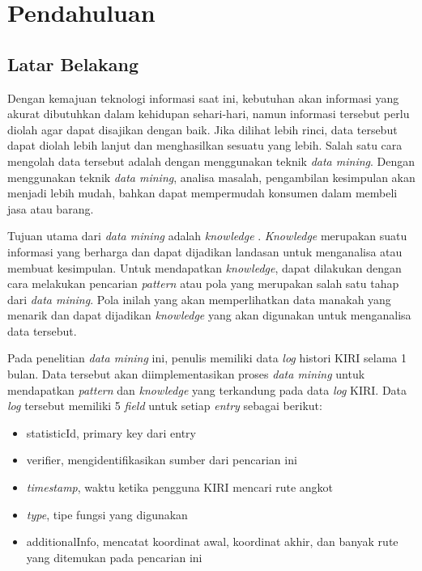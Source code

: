 \chapter{Pendahuluan}
\label{chap:intro}

\section{Latar Belakang}
\label{sec:motivation}

Dengan kemajuan teknologi informasi saat ini, kebutuhan akan informasi yang akurat dibutuhkan dalam kehidupan sehari-hari, namun informasi tersebut perlu diolah agar dapat disajikan dengan baik. Jika dilihat lebih rinci, data tersebut dapat diolah lebih lanjut dan menghasilkan sesuatu yang lebih. Salah satu cara mengolah data tersebut adalah dengan menggunakan teknik \textsl{data mining}. Dengan menggunakan teknik \textsl{data mining}, analisa masalah, pengambilan kesimpulan akan menjadi lebih mudah, bahkan dapat mempermudah konsumen dalam membeli jasa atau barang.

Tujuan utama dari \textsl{data mining} adalah \textsl{knowledge} \cite{DM}. \textsl{Knowledge} merupakan suatu informasi yang berharga dan dapat dijadikan landasan untuk menganalisa atau membuat kesimpulan. Untuk mendapatkan \textsl{knowledge}, dapat dilakukan dengan cara melakukan pencarian \textsl{pattern} atau pola yang merupakan salah satu tahap dari \textsl{data mining}. Pola inilah yang akan memperlihatkan data manakah yang menarik dan dapat dijadikan \textsl{knowledge} yang akan digunakan untuk menganalisa data tersebut.

Pada penelitian \textsl{data mining} ini, penulis memiliki data \textsl{log} histori KIRI selama 1 bulan. Data tersebut akan diimplementasikan proses \textsl{data mining} untuk mendapatkan \textsl{pattern} dan \textsl{knowledge} yang terkandung pada data \textsl{log} KIRI. Data \textsl{log} tersebut memiliki 5 \textsl{field} untuk setiap \textsl{entry} sebagai berikut:
\begin{itemize}
	\item statisticId, primary key dari entry
	\item verifier, mengidentifikasikan sumber dari pencarian ini
	\item \textsl{timestamp}, waktu ketika pengguna KIRI mencari rute angkot
	\item \textsl{type}, tipe fungsi yang digunakan
	\item additionalInfo, mencatat koordinat awal, koordinat akhir, dan banyak rute yang ditemukan pada pencarian ini
\end{itemize}
  
